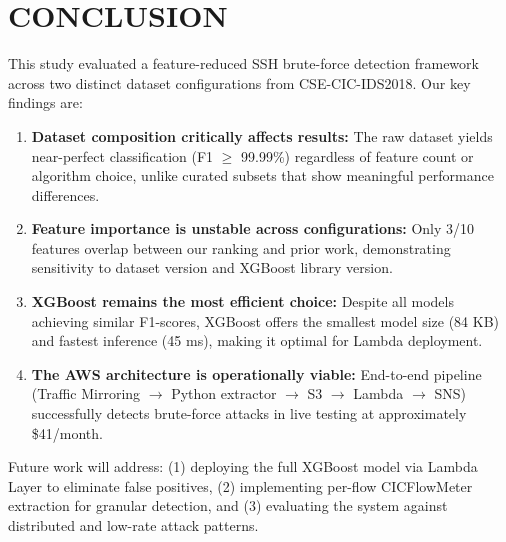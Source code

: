 \documentclass[conference]{IEEEtran}
\begin{document}
\section{CONCLUSION}

This study evaluated a feature-reduced SSH brute-force detection framework across two distinct dataset configurations from CSE-CIC-IDS2018. Our key findings are:

\begin{enumerate}
\item \textbf{Dataset composition critically affects results:} The raw dataset yields near-perfect classification (F1 $\geq$ 99.99\%) regardless of feature count or algorithm choice, unlike curated subsets that show meaningful performance differences.
\item \textbf{Feature importance is unstable across configurations:} Only 3/10 features overlap between our ranking and prior work, demonstrating sensitivity to dataset version and XGBoost library version.
\item \textbf{XGBoost remains the most efficient choice:} Despite all models achieving similar F1-scores, XGBoost offers the smallest model size (84 KB) and fastest inference (45 ms), making it optimal for Lambda deployment.
\item \textbf{The AWS architecture is operationally viable:} End-to-end pipeline (Traffic Mirroring $\rightarrow$ Python extractor $\rightarrow$ S3 $\rightarrow$ Lambda $\rightarrow$ SNS) successfully detects brute-force attacks in live testing at approximately \$41/month.
\end{enumerate}

Future work will address: (1) deploying the full XGBoost model via Lambda Layer to eliminate false positives, (2) implementing per-flow CICFlowMeter extraction for granular detection, and (3) evaluating the system against distributed and low-rate attack patterns.
\end{document}

